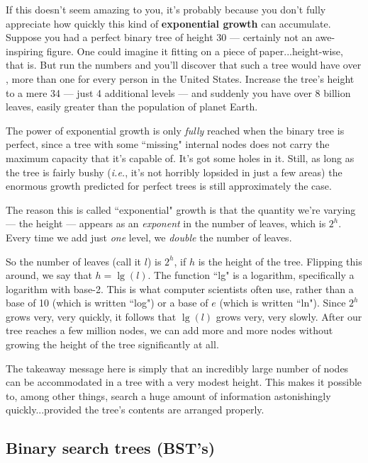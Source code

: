 If this doesn't seem amazing to you, it's probably because you don't fully
appreciate how quickly this kind of \textbf{exponential growth} can
accumulate. Suppose you had a perfect binary tree of height 30 ---
certainly not an awe-inspiring figure. One could imagine it fitting on a
piece of paper...height-wise, that is. But run the numbers and you'll
discover that such a tree would have over , more
than one for every person in the United States. Increase the tree's height
to a mere 34 --- just 4 additional levels --- and suddenly you have over 8
billion leaves, easily greater than the population of planet Earth.

The power of exponential growth is only \textit{fully} reached when the
binary tree is perfect, since a tree with some ``missing" internal nodes
does not carry the maximum capacity that it's capable of. It's got some
holes in it. Still, as long as the tree is fairly bushy (\textit{i.e.},
it's not horribly lopsided in just a few areas) the enormous growth
predicted for perfect trees is still approximately the case.

The reason this is called ``exponential" growth is that the quantity we're
varying --- the height --- appears as an \textit{exponent} in the number of
leaves, which is $2^h$. Every time we add just \textit{one} level, we
\textit{double} the number of leaves. 

So the number of leaves (call it $l$) is $2^h$, if $h$ is the height of the
tree. Flipping this around, we say that $h = \lg(l)$. The function ``lg" is
a logarithm, specifically a logarithm with base-2. This is what computer
scientists often use, rather than a base of 10 (which is written ``log") or
a base of $e$ (which is written ``ln"). Since $2^h$ grows very, very
quickly, it follows that $\lg(l)$ grows very, very slowly. After our tree
reaches a few million nodes, we can add more and more nodes without growing
the height of the tree significantly at all.

The takeaway message here is simply that an incredibly large number of
nodes can be accommodated in a tree with a very modest height. This makes
it possible to, among other things, search a huge amount of information
astonishingly quickly...provided the tree's contents are arranged properly.

\subsection{Binary search trees (BST's)}

